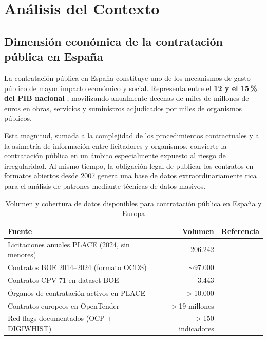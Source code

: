\documentclass[11pt,a4paper,spanish]{book}
\numberwithin{equation}{chapter}
\numberwithin{figure}{chapter}
\begin{document}
\chapter{An{\'a}lisis del Contexto}

\section{Dimensi{\'o}n econ{\'o}mica de la contrataci{\'o}n p{\'u}blica en Espa{\~n}a}

La contrataci{\'o}n p{\'u}blica en Espa{\~n}a constituye uno de los mecanismos de gasto p{\'u}blico de mayor impacto econ{\'o}mico y social. Representa entre el \textbf{12 y el 15\,\% del PIB nacional} \cite{OECD2016Corruption}, movilizando anualmente decenas de miles de millones de euros en obras, servicios y suministros adjudicados por miles de organismos p{\'u}blicos.

Esta magnitud, sumada a la complejidad de los procedimientos contractuales y a la asimetr{\'i}a de informaci{\'o}n entre licitadores y organismos, convierte la contrataci{\'o}n p{\'u}blica en un {\'a}mbito especialmente expuesto al riesgo de irregularidad. Al mismo tiempo, la obligaci{\'o}n legal de publicar los contratos en formatos abiertos desde 2007 \cite{LCSP2017,Ley192013} genera una base de datos extraordinariamente rica para el an{\'a}lisis de patrones mediante t{\'e}cnicas de datos masivos.

\begin{table}[htbp]
\centering
\small
\caption{Volumen y cobertura de datos disponibles para contratación pública en España y Europa}
\label{tab:volumen_datos}
\begin{tabularx}{\textwidth}{@{} l r X @{}}
\toprule
\textbf{Fuente} & \textbf{Volumen} & \textbf{Referencia} \\
\midrule
Licitaciones anuales PLACE (2024, sin menores) & 206.242 & \cite{OIReScon2025} \\
Contratos BOE 2014--2024 (formato OCDS) & $\sim$97.000 & \cite{MunozPla2026} \\
Contratos CPV 71 en dataset BOE & 3.443 & \cite{MunozPla2026} \\
Órganos de contratación activos en PLACE & $>$10.000 & \cite{MinHacienda2024PLACE} \\
Contratos europeos en OpenTender & $>$19 millones & \cite{OpenTenderEU} \\
Red flags documentados (OCP + DIGIWHIST) & $>$150 indicadores & \cite{OCP2024RedFlags} \\
\bottomrule
\end{tabularx}
\normalsize
\end{table}
\end{document}
